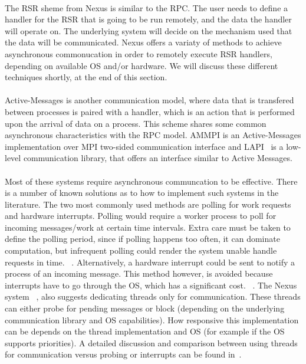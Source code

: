 \paragraph{}
The RSR sheme from Nexus\cite{Foster96thenexus} is similar to the RPC. The user needs to define a handler for the 
RSR that is going to be run remotely, and the data the handler will operate on.  The underlying system will decide
on the mechanism used that the data will be communicated.  Nexus offers a variaty of methods to achieve asynchronous
commonucation in order to remotely execute RSR handlers, depending on available OS and/or hardware.  
We will discuss these different techniques shortly, at the end of this section. 

\paragraph{}
Active-Messages is another communication model, where data that is transfered between processes is paired with 
a handler, which is an action that is performed upon the arrival of data on a process.  This scheme shares some common
asynchronous characteristics with the RPC model. 
AMMPI\cite{Bonachea:ammpi} is an Active-Messages implementation over MPI two-sided communication
interface and LAPI~\cite{Shah:1998:PEL:876880.879642} is a low-level communication library, that offers an interface
similar to Active Messages.  

\paragraph{}
Most of these systems require asynchronous communcation to be effective.  There is a number of known solutions as 
to how to implement such systems in the literature.  The two most commonly used methods are polling for work requests
~\cite{Beckman96tulip:a, Saunders:2003:AAP:966049.781534, Foster96thenexus, vonEicken:1992:AMM:146628.140382} 
and hardware interrupts.
Polling would require a worker process to poll for incoming messages/work at certain
time intervals.   Extra care must be taken to define the polling period, since if polling happens too often, it can
dominate computation, but infrequent polling could render the system unable handle requests in time. 
~\cite{Saunders:2003:AAP:966049.781534, Shah:1998:PEL:876880.879642}.
Alternatively, a hardware interrupt could be sent to notify a process of an incoming message.  This method however,
is avoided because interrupts have to go through the OS, which has a significant cost. 
~\cite{Saunders:2003:AAP:966049.781534, Shah:1998:PEL:876880.879642, Foster96thenexus, vonEicken:1992:AMM:146628.140382}.
The Nexus system ~\cite{Foster96thenexus}, also suggests dedicating threads only for communication.  These threads can 
either probe for pending messages or block (depending on the underlying communication library and OS capabilities).
How responsive this implementation can be depends on the thread implementation and OS (for example if the OS supports
priorities).  A detailed discussion and comparison between using threads for communication versus probing or interrupts
can be found in~\cite{Foster96thenexus}.

